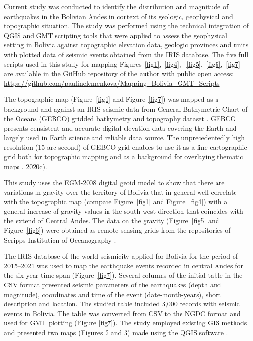 \documentclass[data,article,submit,pdftex,moreauthors]{Definitions/mdpi}
\begin{document}
Current study was conducted to identify the distribution and magnitude of earthquakes in the Bolivian Andes in context of its geologic, geophysical and topographic situation. The study was performed using the technical integration of QGIS and GMT scripting tools that were applied to assess the geophysical setting in Bolivia against topographic elevation data, geologic provinces and units with plotted data of seismic events obtained from the IRIS database. The five full scripts used in this study for mapping Figures~\ref{fig1},~\ref{fig4}, ~\ref{fig5},~\ref{fig6},~\ref{fig7} are available in the GitHub repository of the author with public open access: \href{https://github.com/paulinelemenkova/Mapping_Bolivia_GMT_Scripts}{https://github.com/paulinelemenkova/Mapping\_Bolivia\_GMT\_Scripts}	 

The topographic map (Figure~\ref{fig1} and Figure~\ref{fig7}) was mapped as a background and against an IRIS seismic data from General Bathymetric Chart of the Oceans (GEBCO) gridded bathymetry and topography dataset \cite{Schenke2016}. GEBCO presents consistent and accurate digital elevation data covering the Earth and largely used in Earth science and reliable data source. The unprecedentedly high resolution (15 arc second) of GEBCO grid enables to use it as a fine cartographic grid both for topographic mapping and as a background for overlaying thematic maps \cite{Lemenkova2020b}, 2020c). 

This study uses the EGM-2008 \cite{Pavlis} digital geoid model to show that there are variations in gravity over the territory of Bolivia that in general well correlate with the topographic map (compare Figure~\ref{fig1} and Figure~\ref{fig4}) with a general increase of gravity values in the south-west direction that coincides with the extend of Central Andes. The data on the gravity (Figure~\ref{fig5} and Figure~\ref{fig6}) were obtained as remote sensing grids from the repositories of Scripps Institution of Oceanography \cite{Sandwelletal2014}. 

The IRIS database of the world seismicity applied for Bolivia for the period of 2015–2021 was used to map the earthquake events recorded in central Andes for the six-year time span (Figure~\ref{fig7}). Several columns of the initial table in the CSV format presented seismic parameters of the earthquakes (depth and magnitude), coordinates and time of the event (date-month-years), short description and location. The studied table included 3,000 records with seismic events in Bolivia. The table was converted from CSV to the NGDC format and used for GMT plotting (Figure \ref{fig7}). The study employed existing GIS methods \cite{Hubbard,Lemenkova202135,Suetova,Lemenkova202125,Klauco2013,Klauco2017} and presented two maps (Figures 2 and 3) made using the QGIS software \cite{QGIS}.
\end{document}
